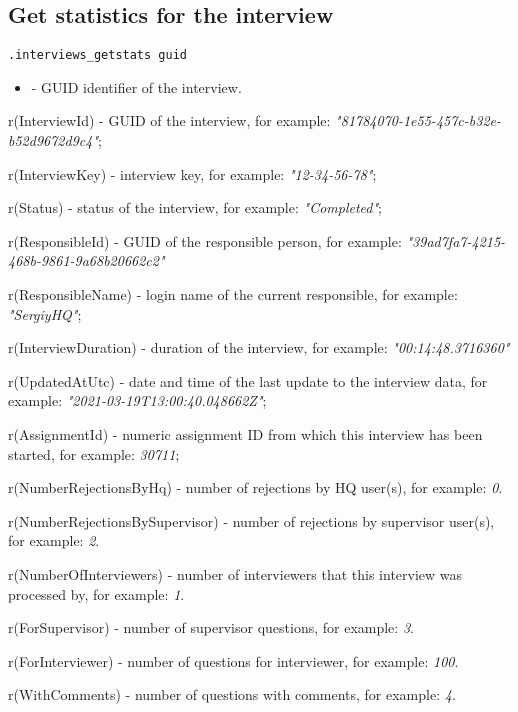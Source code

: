 \subsection{Get statistics for the interview}
\begin{lstlisting}[style=CommandLineStyle]
.interviews_getstats guid
\end{lstlisting}
\paramsheader
\begin{itemize}
    \item {} - GUID identifier of the interview.
\end{itemize}
\savedres
\begin{compactitem}
    \item r(InterviewId) - GUID of the interview, for example: \textit{"81784070-1e55-457c-b32e-b52d9672d9c4"};
    \item r(InterviewKey) - interview key, for example: \textit{"12-34-56-78"};
    \item r(Status) - status of the interview, for example: \textit{"Completed"};
    \item r(ResponsibleId) - GUID of the responsible person, for example: \textit{"39ad7fa7-4215-468b-9861-9a68b20662c2"}
    \item r(ResponsibleName) - login name of the current responsible, for example: \textit{"SergiyHQ"};
    \item r(InterviewDuration) - duration of the interview, for example: \textit{"00:14:48.3716360"}
    \item r(UpdatedAtUtc) - date and time of the last update to the interview data, for example: \textit{"2021-03-19T13:00:40.048662Z"};
    \item r(AssignmentId) - numeric assignment ID from which this interview has been started, for example: \textit{30711};
    \item r(NumberRejectionsByHq) - number of rejections by HQ user(s), for example: \textit{0}.
    \item r(NumberRejectionsBySupervisor) - number of rejections by supervisor user(s), for example: \textit{2}.
    \item r(NumberOfInterviewers) - number of interviewers that this interview was processed by, for example: \textit{1}.
    \item r(ForSupervisor) - number of supervisor questions, for example: \textit{3}.
    \item r(ForInterviewer) - number of questions for interviewer, for example: \textit{100}.
    \item r(WithComments) - number of questions with comments, for example: \textit{4}.

\end{compactitem}
